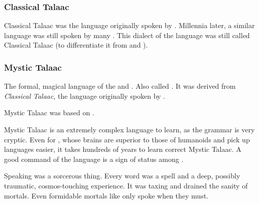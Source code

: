 




\subsubsection{Classical Talaac}
Classical Talaac was the language originally spoken by .
Millennia later, a similar language was still spoken by many \ophidians. 
This  dialect of the language was still called Classical Talaac (to differentiate it from  and ).





\subsubsection{Mystic Talaac}
\index{\TrueDraconic}
The formal, magical language of the \dragons and \ophidians.
Also called \emph{\TrueDraconic}. 
It was derived from \emph{Classical Talaac}, the language originally spoken by . 

Mystic Talaac was based on . 

Mystic Talaac is an extremely complex language to learn, as the grammar is very cryptic. 
Even for \dragons{}, whose brains are superior to those of humanoids and pick up languages easier, it takes hundreds of years to learn correct Mystic Talaac. 
A good command of the language is a sign of status among \dragons{}. 

Speaking \TrueDraconic was a sorcerous thing. 
Every word was a spell and a deep, possibly traumatic, cosmos-touching experience.
It was taxing and drained the sanity of mortals. 
Even formidable mortals like \Criseis only spoke \TrueDraconic when they must.






